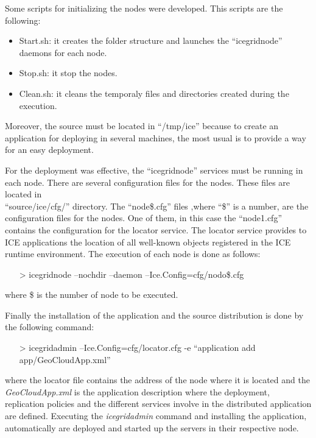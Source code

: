 Some scripts for initializing the nodes were developed. This scripts are the
following: 
\begin{itemize}
\item Start.sh: it creates the folder structure and launches the
  ``icegridnode'' daemons for each node.
\item Stop.sh: it stop the nodes.
\item Clean.sh: it cleans the temporaly files and directories created during the execution.
\end{itemize}

Moreover, the source must be located in ``/tmp/ice'' because to create an application for
deploying in several machines, the most usual is to provide a way for an easy
deployment. 

For the deployment was effective, the ``icegridnode'' services must be running
in each node. 
There are several configuration files for the nodes. These files are located in\\
``source/ice/cfg/'' directory. The ``node\$.cfg'' files ,where ``\$'' is a number,
are the configuration files for the nodes. One of them, in this case the
``node1.cfg'' contains the configuration for the locator service. 
The locator service provides to ICE applications the location of all well-known
objects registered in the ICE runtime environment. 
The execution of each node is done as follows:
\begin{itemize}
\item[>]icegridnode --nochdir --daemon --Ice.Config=cfg/nodo\$.cfg
\end{itemize}
where \$ is the number of node to be executed.
 
Finally the installation of the application and the source distribution is done
by the following command:
\begin{itemize}
\item[>]icegridadmin --Ice.Config=cfg/locator.cfg -e ``application add
  app/GeoCloudApp.xml''
\end{itemize}

where the locator file contains the address of the node where it is located and
the \emph{GeoCloudApp.xml} is the application description where the deployment,
replication policies and the different services involve in the distributed
application are defined. Executing the \emph{icegridadmin} command and
installing the application, automatically are deployed and started up the
servers in their respective node.

